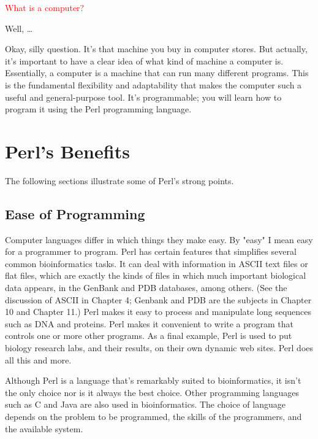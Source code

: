 \textcolor{red}{What is a computer?}

\begin{adjustwidth}{1cm}{}
Well, \ldots

Okay, silly question. It's that machine you buy in computer stores. But actually, it's important to have a clear idea of what kind of machine a computer is. Essentially, a computer is a machine that can run many different programs.  This is the fundamental flexibility and adaptability that makes the computer such a useful and general-purpose tool. It's programmable; you will learn how to program it using the Perl programming language. 
\end{adjustwidth}

\section{Perl's Benefits}
The following sections illustrate some of Perl's strong points.

\subsection{Ease of Programming}
Computer languages differ in which things they make easy. By "easy" I mean easy for a programmer to program. Perl has certain features that simplifies several common bioinformatics tasks. It can deal with information in ASCII text files or flat files, which are exactly the kinds of files in which much important biological data appears, in the GenBank and PDB databases, among others. (See the discussion of ASCII in Chapter 4; Genbank and PDB are the subjects in Chapter 10 and Chapter 11.) Perl makes it easy to process and manipulate long sequences such as DNA and proteins. Perl makes it convenient to write a program that controls one or more other programs. As a final example, Perl is used to put biology research labs, and their results, on their own dynamic web sites. Perl does all this and more.

Although Perl is a language that's remarkably suited to bioinformatics, it isn't the only choice nor is it always the best choice. Other programming languages such as C and Java are also used in bioinformatics. The choice of language depends on the problem to be programmed, the skills of the programmers, and the available system.

